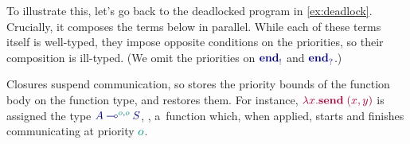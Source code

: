 \documentclass[main.tex]{subfiles}
\begin{document}
To illustrate this, let's go back to the deadlocked program in \cref{ex:deadlock}. Crucially, it composes the terms below in parallel. While each of these terms itself is well-typed, they impose opposite conditions on the priorities, so their composition is ill-typed. (We omit the priorities on $\ty{\tyends}$ and $\ty{\tyendr}$.)
\begin{mathpar}
  \small
  
\end{mathpar}
Closures suspend communication, so  stores the priority bounds of the function body on the function type, and  restores them. For instance, $\tm{\lambda{x}.\send\;\pair{x}{y}}$ is assigned the type $\ty{\tylolli[\cs{o},\cs{o}]{A}{S}}$, \ie, a~function which, when applied, starts and finishes communicating at priority $\cs{o}$.
\begin{mathpar}
  \small
\end{mathpar}
\end{document}
